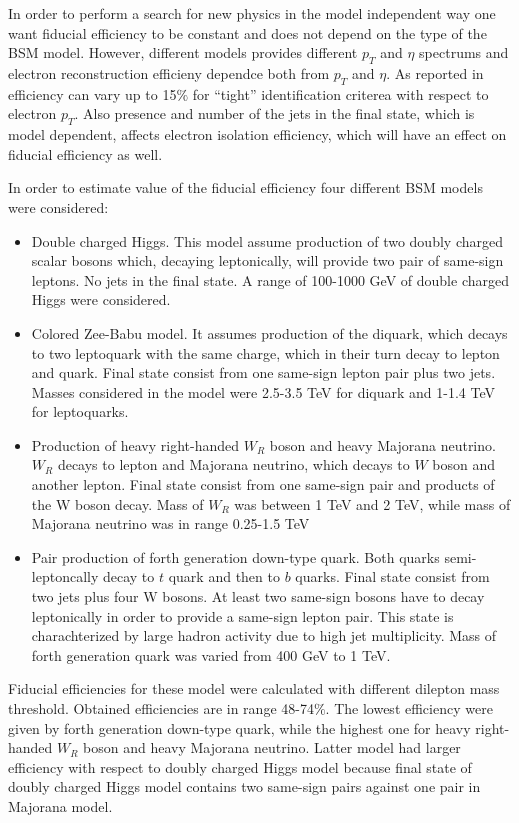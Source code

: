 In order to perform a search for new physics in the model independent way one want fiducial efficiency to be constant and does not depend on the type of the BSM model.
However, different models provides different $p_T$ and $\eta$ spectrums and electron reconstruction efficieny dependce both from $p_T$ and $\eta$.
As reported in~\cite{electron_tight} efficiency can vary up to 15$\%$ for ``tight'' identification criterea with respect to electron $p_T$.
Also presence and number of the jets in the final state, which is model dependent, affects electron isolation efficiency, which will have an effect on 
fiducial efficiency as well.

In order to estimate value of the fiducial efficiency four different BSM models were considered:
\begin{itemize}
 \item Double charged Higgs. This model assume production of two doubly charged scalar bosons which, decaying leptonically, will provide two pair of same-sign leptons.
 No jets in the final state. A range of 100-1000 GeV of double charged Higgs were considered.
 \item Colored Zee-Babu model. It assumes production of the diquark, which decays to two leptoquark with the same charge, 
 which in their turn decay to lepton and quark. Final state consist from one same-sign lepton pair plus two jets.
 Masses considered in the model were 2.5-3.5 TeV for diquark and 1-1.4 TeV for leptoquarks.
 \item Production of heavy right-handed $W_R$ boson and heavy Majorana neutrino. $W_R$ decays to lepton and Majorana neutrino, 
 which decays to $W$ boson and another lepton. Final state consist from one same-sign pair and products of the W boson decay.
 Mass of $W_R$ was between 1 TeV and 2 TeV, while mass of Majorana neutrino was in range 0.25-1.5 TeV
 \item Pair production of forth generation down-type quark. Both quarks semi-leptoncally decay to $t$ quark and then to $b$ quarks.
 Final state consist from two jets plus four W bosons. At least two same-sign bosons have to decay leptonically in order to provide a same-sign lepton pair.
 This state is charachterized by large hadron activity due to high jet multiplicity.
 Mass of forth generation quark was varied from 400 GeV to 1 TeV.
\end{itemize}
Fiducial efficiencies for these model were calculated with different dilepton mass threshold.
Obtained efficiencies are in range 48-74$\%$. The lowest efficiency were given by forth generation down-type quark, while the highest one 
for heavy right-handed $W_R$ boson and heavy Majorana neutrino. Latter model had larger efficiency with respect to doubly charged Higgs model
because final state of doubly charged Higgs model contains two same-sign pairs against one pair in Majorana model.

